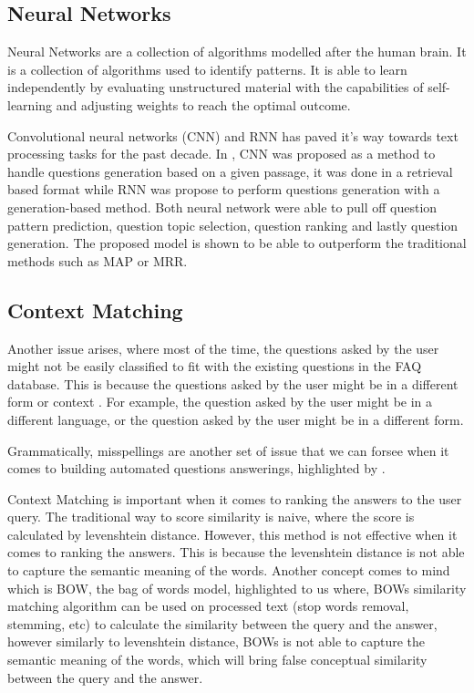 \pagebreak
\subsection{Neural Networks}
Neural Networks are a collection of algorithms modelled after the human brain. It is a collection of algorithms used to identify patterns. It is able to learn independently by evaluating unstructured material with the capabilities of self-learning and adjusting weights to reach the optimal outcome.

Convolutional neural networks (CNN) and RNN has paved it's way towards text processing tasks for the past decade. In \cite{duan-etal-2017-question}, CNN was proposed as a method to handle questions generation based on a given passage, it was done in a retrieval based format while RNN was propose to perform questions generation with a generation-based method. Both neural network were able to pull off question pattern prediction, question topic selection, question ranking and lastly question generation. The proposed model is shown to be able to outperform the traditional methods such as MAP or MRR.

\pagebreak
\subsection{Context Matching} \label{lit:context_matching}
Another issue arises, where most of the time, the questions asked by the user might not be easily classified to fit with the existing questions in the FAQ database. This is because the questions asked by the user might be in a different form or context \cite{10.1007/978-3-319-42911-3_25}. For example, the question asked by the user might be in a different language, or the question asked by the user might be in a different form. 

Grammatically, misspellings are another set of issue that we can forsee when it comes to building automated questions answerings, highlighted by \cite{sms_faq_retrieval}.

Context Matching is important when it comes to ranking the answers to the user query. The traditional way to score similarity is naive, where the score is calculated by levenshtein distance. \cite{8054419} However, this method is not effective when it comes to ranking the answers. This is because the levenshtein distance is not able to capture the semantic meaning of the words. Another concept comes to mind which is BOW, the bag of words model, \cite{Improving_question_retrieval_in_community_question_answering_using_world_knowledge} highlighted to us where, BOWs similarity matching algorithm can be used on processed text (stop words removal, stemming, etc) to calculate the similarity between the query and the answer, however similarly to levenshtein distance, BOWs is not able to capture the semantic meaning of the words, which will bring false conceptual similarity between the query and the answer.

